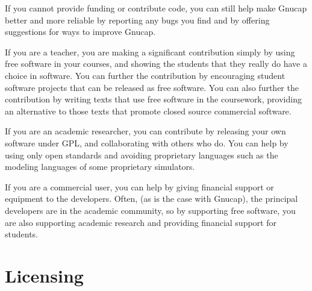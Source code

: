 If you cannot provide funding or contribute code, you can still help
make Gnucap better and more reliable by reporting any bugs you find
and by offering suggestions for ways to improve Gnucap.

If you are a teacher, you are making a significant contribution simply
by using free software in your courses, and showing the students that
they really do have a choice in software. You can further the
contribution by encouraging student software projects that can be
released as free software. You can also further the contribution by
writing texts that use free software in the coursework, providing an
alternative to those texts that promote closed source commercial
software.

If you are an academic researcher, you can contribute by releasing
your own software under GPL, and collaborating with others who do. You
can help by using only open standards and avoiding proprietary
languages such as the modeling languages of some proprietary
simulators.

If you are a commercial user, you can help by giving financial support
or equipment to the developers. Often, (as is the case with Gnucap),
the principal developers are in the academic community, so by
supporting free software, you are also supporting academic research
and providing financial support for students.
\section{Licensing}
	
